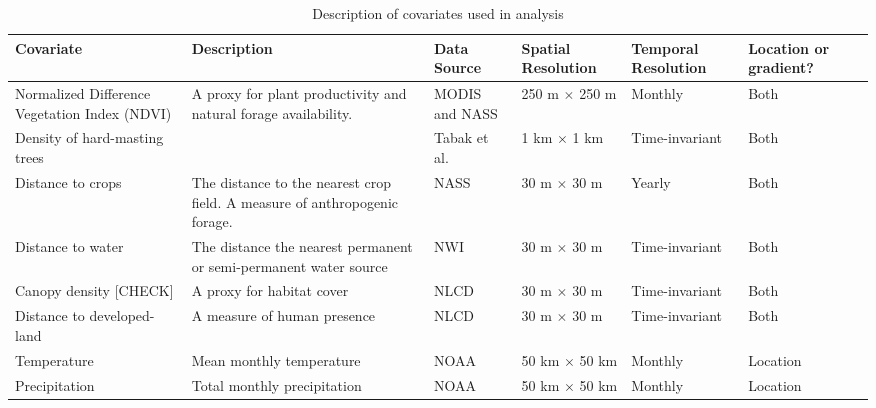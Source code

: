 \documentclass[a4paper]{article}
\begin{document}
\clearpage

\def\arraystretch{1.5}
\begin{sidewaystable}
\caption{Description of covariates used in analysis}
\begin{tabular}{p{4 cm}  p{4 cm}  p{4 cm}  p{4 cm}  p{4 cm}  p{2 cm} p{2cm}}
	Covariate & Description & Data Source & Spatial Resolution & Temporal Resolution & Location \newline or gradient? \\
	\hline
	Normalized Difference \newline Vegetation Index (NDVI) & A proxy for plant productivity and natural forage availability.  & MODIS and NASS & 250 m $\times$ 250 m & Monthly & Both \\ 
	Density of hard-masting trees & & Tabak et al. & 1 km $\times$ 1 km & Time-invariant & Both \\
	Distance to crops & The distance to the nearest crop field. A measure of anthropogenic forage. & NASS & 30 m $\times$ 30 m & Yearly & Both \\
	Distance to water & The distance the nearest permanent or semi-permanent water source & NWI & 30 m $\times$ 30 m & Time-invariant & Both \\
	Canopy density [CHECK] & A proxy for habitat cover & NLCD & 30 m $\times$ 30 m & Time-invariant & Both \\
	Distance to developed-land & A measure of human presence & NLCD & 30 m $\times$ 30 m & Time-invariant & Both \\
	Temperature & Mean monthly temperature & NOAA & 50 km $\times$ 50 km & Monthly & Location \\
	Precipitation & Total monthly precipitation & NOAA & 50 km $\times$ 50 km & Monthly & Location \\

\end{tabular}
\end{sidewaystable}



\end{document}
